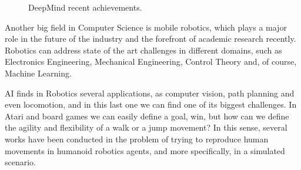 \begin{figure}[ht]
	 \caption{DeepMind recent achievements.}
	\label{fig:deepmind_examples}
\end{figure}


Another big field in Computer Science is mobile robotics, which plays a major role in the future of the industry and the forefront of academic research recently. Robotics can address state of the art challenges in different domains, such as Electronics Engineering, Mechanical Engineering, Control Theory and, of course, Machine Learning.

AI finds in Robotics several applications, as computer vision, path planning and even locomotion, and in this last one we can find one of its biggest challenges. In Atari and board games we can easily define a goal, win, but how can we define the agility and flexibility of a walk or a jump movement? In this sense, several works have been conducted in the problem of trying to reproduce human movements in humanoid robotics agents, and more specifically, in a simulated scenario.

